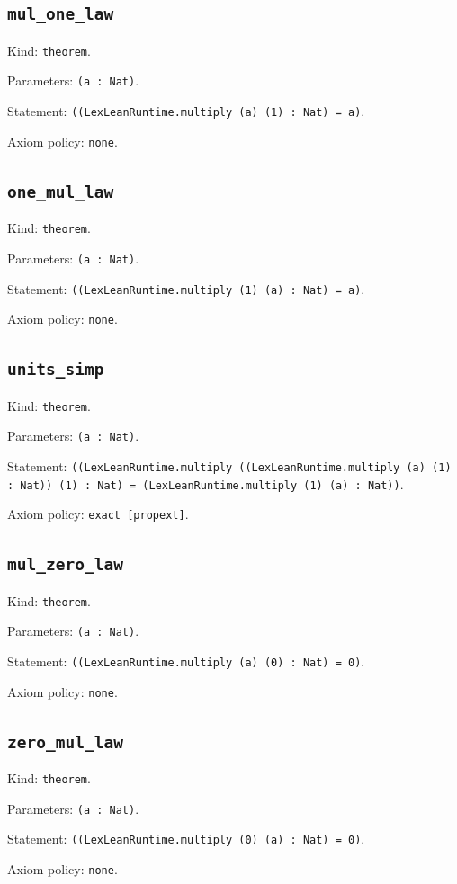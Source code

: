 \documentclass[11pt]{article}
\begin{document}
\subsection*{\texttt{mul\_one\_law}}
\noindent Kind: \texttt{theorem}.\par
\noindent Parameters: \texttt{(a : Nat)}.\par
\noindent Statement: \texttt{((LexLeanRuntime.multiply (a) (1) : Nat) = a)}.\par
\noindent Axiom policy: \texttt{none}.\par
\subsection*{\texttt{one\_mul\_law}}
\noindent Kind: \texttt{theorem}.\par
\noindent Parameters: \texttt{(a : Nat)}.\par
\noindent Statement: \texttt{((LexLeanRuntime.multiply (1) (a) : Nat) = a)}.\par
\noindent Axiom policy: \texttt{none}.\par
\subsection*{\texttt{units\_simp}}
\noindent Kind: \texttt{theorem}.\par
\noindent Parameters: \texttt{(a : Nat)}.\par
\noindent Statement: \texttt{((LexLeanRuntime.multiply ((LexLeanRuntime.multiply (a) (1) : Nat)) (1) : Nat) = (LexLeanRuntime.multiply (1) (a) : Nat))}.\par
\noindent Axiom policy: \texttt{exact [propext]}.\par
\subsection*{\texttt{mul\_zero\_law}}
\noindent Kind: \texttt{theorem}.\par
\noindent Parameters: \texttt{(a : Nat)}.\par
\noindent Statement: \texttt{((LexLeanRuntime.multiply (a) (0) : Nat) = 0)}.\par
\noindent Axiom policy: \texttt{none}.\par
\subsection*{\texttt{zero\_mul\_law}}
\noindent Kind: \texttt{theorem}.\par
\noindent Parameters: \texttt{(a : Nat)}.\par
\noindent Statement: \texttt{((LexLeanRuntime.multiply (0) (a) : Nat) = 0)}.\par
\noindent Axiom policy: \texttt{none}.\par
\end{document}
